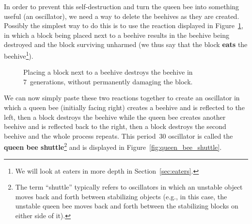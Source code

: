 In order to prevent this self-destruction and turn the queen bee into something useful (an oscillator), we need a way to delete the beehives as they are created. Possibly the simplest way to do this is to use the reaction displayed in Figure~\ref{fig:beehive_block}, in which a block being placed next to a beehive results in the beehive being destroyed and the block surviving unharmed (we thus say that the block \textbf{eats} the beehive\footnote{We will look at eaters in more depth in Section~\ref{sec:eaters}.}).

\begin{figure}[!htb]
	\centering
	\caption{Placing a block next to a beehive destroys the beehive in 7~generations, without permanently damaging the block.}\label{fig:beehive_block}
\end{figure}

We can now simply paste these two reactions together to create an oscillator in which a queen bee (initially facing right) creates a beehive and is reflected to the left, then a block destroys the beehive while the queen bee creates another beehive and is reflected back to the right, then a block destroys the second beehive and the whole process repeats. This period~30 oscillator is called the \textbf{queen bee shuttle}\footnote{The term ``shuttle'' typically refers to oscillators in which an unstable object moves back and forth between stabilizing objects (e.g., in this case, the unstable queen bee moves back and forth between the stabilizing blocks on either side of it).} and is displayed in Figure~\ref{fig:queen_bee_shuttle}.

